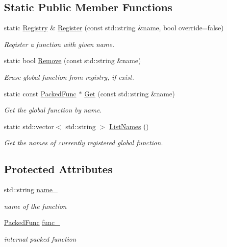 \subsection*{Static Public Member Functions}
\begin{DoxyCompactItemize}
\item 
static \hyperlink{classtvm_1_1runtime_1_1Registry}{Registry} \& \hyperlink{classtvm_1_1runtime_1_1Registry_a227ffef03991cd50224d5d31257a475a}{Register} (const std\+::string \&name, bool override=false)
\begin{DoxyCompactList}\small\item\em Register a function with given name. \end{DoxyCompactList}\item 
static bool \hyperlink{classtvm_1_1runtime_1_1Registry_aad89aa915515019c59364b7b569c4648}{Remove} (const std\+::string \&name)
\begin{DoxyCompactList}\small\item\em Erase global function from registry, if exist. \end{DoxyCompactList}\item 
static const \hyperlink{classtvm_1_1runtime_1_1PackedFunc}{Packed\+Func} $\ast$ \hyperlink{classtvm_1_1runtime_1_1Registry_afcddc7b207f519f92c622e6918076635}{Get} (const std\+::string \&name)
\begin{DoxyCompactList}\small\item\em Get the global function by name. \end{DoxyCompactList}\item 
static std\+::vector$<$ std\+::string $>$ \hyperlink{classtvm_1_1runtime_1_1Registry_a5c2ff3b997756d76a1ae5fb1d3cc550d}{List\+Names} ()
\begin{DoxyCompactList}\small\item\em Get the names of currently registered global function. \end{DoxyCompactList}\end{DoxyCompactItemize}
\subsection*{Protected Attributes}
\begin{DoxyCompactItemize}
\item 
std\+::string \hyperlink{classtvm_1_1runtime_1_1Registry_a4d8221b67729bafee4c2c5b424ed80ea}{name\+\_\+}
\begin{DoxyCompactList}\small\item\em name of the function \end{DoxyCompactList}\item 
\hyperlink{classtvm_1_1runtime_1_1PackedFunc}{Packed\+Func} \hyperlink{classtvm_1_1runtime_1_1Registry_a911416a22858355e0b95ec493db67218}{func\+\_\+}
\begin{DoxyCompactList}\small\item\em internal packed function \end{DoxyCompactList}\end{DoxyCompactItemize}
